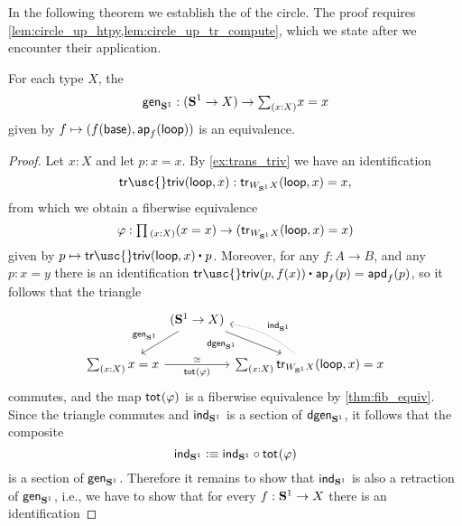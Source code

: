 In the following theorem we establish the  of the circle. The proof requires \cref{lem:circle_up_htpy,lem:circle_up_tr_compute}, which we state after we encounter their application.

\begin{thm}\label{thm:circle_up} 
For each type $X$, the 
\begin{equation*}
\mathsf{gen}_{\sphere{1}}:(\sphere{1}\to X)\to \sm{x:X}x=x
\end{equation*}
given by $f\mapsto (f(\mathsf{base}),\mathsf{ap}_{f}({\mathsf{loop}}))$ is an equivalence.
\end{thm}

\begin{proof}
Let $x:X$ and let $p:x=x$. By \cref{ex:trans_triv} we have an identification 
\begin{equation*}
\mathsf{tr\usc{}triv}(\lloop,x):\mathsf{tr}_{W_{\sphere{1}}X}(\lloop,x)=x,
\end{equation*}
from which we obtain a fiberwise equivalence
\begin{equation*}
\varphi : \prd{x:X} (x=x) \to (\mathsf{tr}_{W_{\sphere{1}}X}(\lloop,x)=x)
\end{equation*}
given by $p\mapsto \ct{\mathsf{tr\usc{}triv}(\lloop,x)}{p}$.
Moreover, for any $f:A\to B$, and any $p:x=y$ there is an identification $\ct{\mathsf{tr\usc{}triv}(p,f(x))}{\mathsf{ap}_f(p)}=\apd{f}{p}$, so it follows that the triangle
\begin{equation*}
\begin{tikzcd}[column sep=0]
& (\sphere{1}\to X) \arrow[dl,swap,"\mathsf{gen}_{\sphere{1}}"] \arrow[dr,swap,"\mathsf{dgen}_{\sphere{1}}" near start] \\
\sm{x:X}x=x \arrow[rr,"\total{\varphi}"',"\eqvsym"] & & \sm{x:X} \mathsf{tr}_{W_{\sphere{1}}X}(\lloop,x)=x \arrow[ul,densely dotted,bend right=15,swap,"\ind{\sphere{1}}"]
\end{tikzcd}
\end{equation*}
commutes, and the map $\mathsf{tot}_{}(\varphi)$ is a fiberwise equivalence by \cref{thm:fib_equiv}. Since the triangle commutes and $\mathsf{ind}_{\mathbf{S}^{1}}$ is a section of $\mathsf{dgen}_{\mathbf{S}^{1}}$, it follows that the composite
\begin{equation*}
\mathsf{ind}_{\mathbf{S}^{1}}\vcentcolon\equiv \mathsf{ind}_{\mathbf{S}^{1}}\circ \mathsf{tot}_{}(\varphi)
\end{equation*}
is a section of $\mathsf{gen}_{\mathbf{S}^{1}}$. Therefore it remains to show that $\mathsf{ind}_{\mathbf{S}^{1}}$ is also a retraction of $\mathsf{gen}_{\mathbf{S}^{1}}$, i.e., we have to show that for every $f:\mathbf{S}^{1}\to X$ there is an identification

\end{proof}
